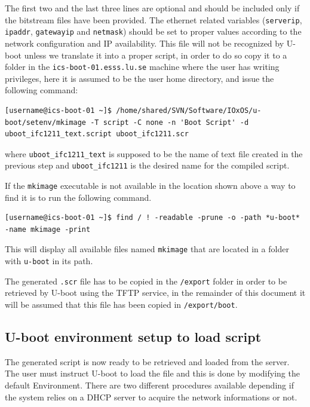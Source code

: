 \documentclass[11pt
  , a4paper
  , article
  , oneside
  , showtrims
]{memoir}
\begin{document}
The first two and the last three lines are optional and should be included only if the bitstream files have been provided.
The ethernet related variables (\texttt{serverip}, \texttt{ipaddr}, \texttt{gatewayip} and \texttt{netmask}) should be set to proper values according to the network configuration and IP availability. 
This file will not be recognized by U-boot unless we translate it into a proper script, in order to do so copy it to a folder in the \texttt{ics-boot-01.esss.lu.se} machine where the user has writing privileges, here it is assumed to be the user home directory, and issue the following command:

\begin{lstlisting}[style=termstyle]
[username@ics-boot-01 ~]$ /home/shared/SVN/Software/IOxOS/u-boot/setenv/mkimage -T script -C none -n 'Boot Script' -d uboot_ifc1211_text.script uboot_ifc1211.scr
\end{lstlisting}

where \texttt{uboot\_ifc1211\_text} is supposed to be the name of text file created in the previous step and \texttt{uboot\_ifc1211} is the desired name for the compiled script.

If the \texttt{mkimage} executable is not available in the location shown above a way to find it is to run the following command.

\begin{lstlisting}[style=termstyle]
[username@ics-boot-01 ~]$ find / ! -readable -prune -o -path *u-boot* -name mkimage -print
\end{lstlisting}

This will display all available files named \texttt{mkimage} that are located in a folder with \texttt{u-boot} in its path.

The generated \texttt{.scr} file has to be copied in the \texttt{/export} folder in order to be retrieved by U-boot using the TFTP service, in the remainder of this document it will be assumed that this file has been copied in \texttt{/export/boot}.



\subsection{U-boot environment setup to load script}
The generated script is now ready to be retrieved and loaded from the server.
The user must instruct U-boot to load the file and this is done by modifying the default Environment.
There are two different procedures available depending if the system relies on a DHCP server to acquire the network informations or not.
\end{document}

